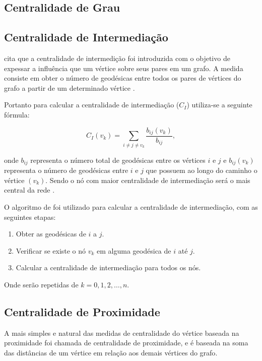 \documentclass[12pt]{article}
\begin{document}
\subsection{Centralidade de Grau}

\subsection{Centralidade de Intermediação}
\cite{freitas} cita que a centralidade de intermedição foi introduzida com o objetivo de expessar a influência que um vértice sobre seus pares em um grafo.
A medida consiste em obter o número de geodésicas entre todos os pares de vértices do grafo a partir de um determinado vértice \cite{freitas}.

Portanto para calcular a centralidade de intermediação ($C_I$) utiliza-se a seguinte fórmula: 
\begin{center}
\begin{equation}
C_I(v_k)=\sum_{i\neq j \neq v_{k}} \frac{b_{ij}(v_k)}{b_{ij}},
\end{equation}
\end{center}
onde $b_{ij}$ representa o número total de geodésicas entre os vértices $i$ e $j$ e  $b_{ij}(v_k)$ representa o número de geodésicas entre $i$ e $j$ que possuem ao longo do caminho o vértice $(v_k)$.
Sendo o nó com maior centralidade de intermediação será o mais central da rede \cite{ufimtsev} \cite{freeman}.

O algoritmo de \cite{Brandes01afaster} foi utilizado para calcular a centralidade de intermediação, com as seguintes etapas:
\begin{enumerate}
\item Obter as geodésicas de $i$ a $j$.
\item Verificar se existe o nó $v_k$ em alguma geodésica de $i$ até $j$.
\item Calcular a centralidade de intermediação para todos os nós.
\end{enumerate}
Onde serão repetidas de $k = 0,1,2,\dots,n$.

\subsection{Centralidade de Proximidade}
A mais simples e natural das medidas de centralidade do vértice baseada na proximidade foi chamada de centralidade de proximidade, e é baseada na soma das distâncias de um  vértice em relação aos demais vértices do grafo\cite{freitas}.
\end{document}
